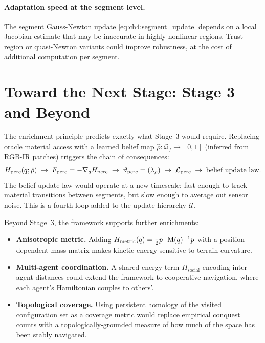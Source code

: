 \paragraph{Adaptation speed at the segment level.}
The segment Gauss-Newton update \eqref{eq:ch4:segment_update} depends
on a local Jacobian estimate that may be inaccurate in highly nonlinear
regions.
Trust-region or quasi-Newton variants could improve robustness, at the
cost of additional computation per segment.

\section{Toward the Next Stage: Stage 3 and Beyond}
\label{sec:ch5:future}

The enrichment principle predicts exactly what Stage~3 would require.
Replacing oracle material access with a learned belief map
$\hat\rho : \mathcal{Q}_f \to [0,1]$ (inferred from RGB-IR patches)
triggers the chain of consequences:
\begin{equation}
  H_{\mathrm{perc}}(q;\hat\rho)
  \;\to\; F_{\mathrm{perc}} = -\nabla_q H_{\mathrm{perc}}
  \;\to\; \vartheta_{\mathrm{perc}} = (\lambda_\rho)
  \;\to\; \mathcal{L}_{\mathrm{perc}}
  \;\to\; \text{belief update law}.
  \label{eq:ch5:stage3_chain}
\end{equation}
The belief update law would operate at a new timescale: fast enough to
track material transitions between segments, but slow enough to average
out sensor noise.
This is a fourth loop added to the update hierarchy $\mathcal{U}$.

Beyond Stage~3, the framework supports further enrichments:

\begin{itemize}
  \item \textbf{Anisotropic metric.}
        Adding $H_{\mathrm{metric}}(q) = \frac{1}{2}p^\top
        \mathrm{M}(q)^{-1}p$ with a position-dependent mass matrix
        makes kinetic energy sensitive to terrain curvature.
  \item \textbf{Multi-agent coordination.}
        A shared energy term $H_{\mathrm{social}}$ encoding inter-agent
        distances could extend the framework to cooperative navigation,
        where each agent's Hamiltonian couples to others'.
  \item \textbf{Topological coverage.}
        Using persistent homology of the visited configuration set as
        a coverage metric would replace empirical conquest counts with
        a topologically-grounded measure of how much of the space has
        been stably navigated.
\end{itemize}

